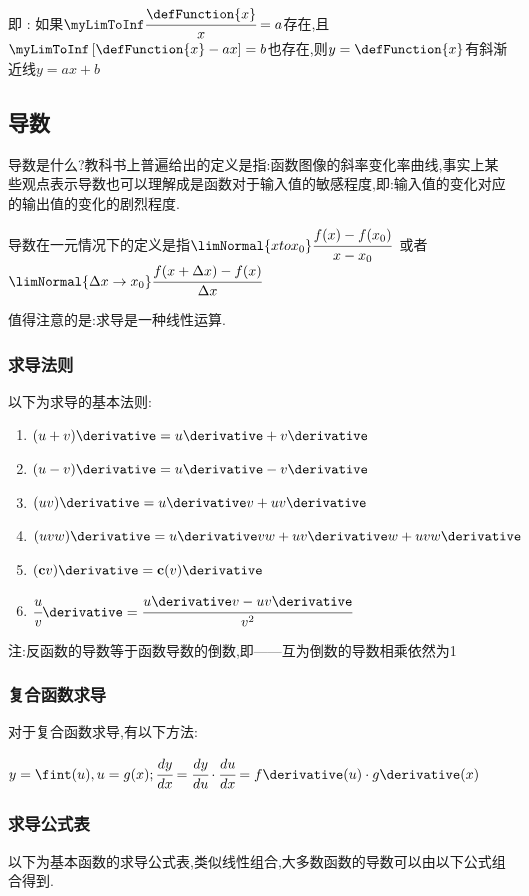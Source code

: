{{\begin{itemize}
{          即 : 如果$\myLimToInf\cfrac{\defFunction{x}}{x} = a$存在,且$\myLimToInf\left[\defFunction{x} - ax\right] = b$也存在,则$y = \defFunction{x}$有斜渐近线$y = ax + b$
          }
  \end{itemize}
}%

\subsection{导数}{
  导数是什么?教科书上普遍给出的定义是指:函数图像的斜率变化率曲线,事实上某些观点表示导数也可以理解成是函数对于输入值的敏感程度,即:输入值的变化对应的输出值的变化的剧烈程度.

  导数在一元情况下的定义是指$\limNormal{x to x_0}\cfrac{f(x) - f(x_0)}{x - x_0}$\ 或者\ $\limNormal{\Delta x \to x_0}\cfrac{f(x + \Delta x) - f(x)}{\Delta x}$

  值得注意的是:求导是一种线性运算.

  \subsubsection{求导法则}{
    以下为求导的基本法则:
    \begin{enumerate}
      \item $(u + v)\derivative = u\derivative + v\derivative$
      \item $(u - v)\derivative = u\derivative - v\derivative$
      \item $(uv)\derivative = u\derivative v + uv\derivative$
      \item $(uvw)\derivative = u\derivative vw + uv\derivative w + uvw\derivative$
      \item $(\mathbf{c}v)\derivative = \mathbf{c}(v)\derivative$
      \item $\cfrac{u}{v}\derivative = \cfrac{u\derivative v - uv\derivative}{v^2}$
    \end{enumerate}
    注:反函数的导数等于函数导数的倒数,即——互为倒数的导数相乘依然为1
  }%

  \subsubsection{复合函数求导}{
    对于复合函数求导,有以下方法:

    $y = \fint(u), u = g(x); \cfrac{dy}{dx} = \cfrac{dy}{du} \cdot \cfrac{du}{dx} = f\derivative(u) \cdot g\derivative(x)$
  }%

  \subsubsection{求导公式表}{
    以下为基本函数的求导公式表,类似线性组合,大多数函数的导数可以由以下公式组合得到.

}}}
